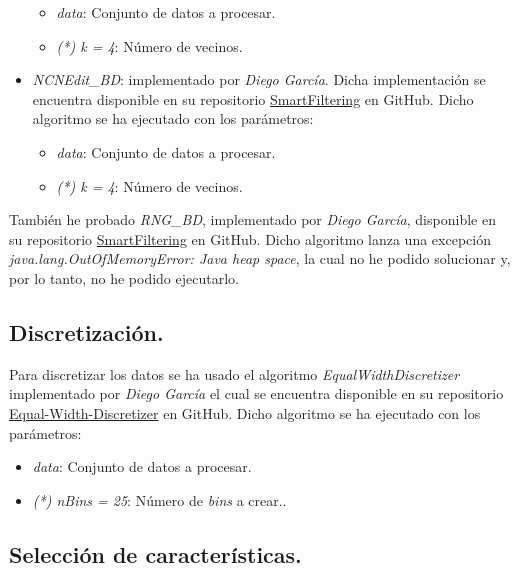 \documentclass[11pt]{article}
\begin{document}
\begin{itemize}
	\begin{itemize}
		\item \textit{data}: Conjunto de datos a procesar.
		\item \textit{(*) k = 4}: Número de vecinos.
	\end{itemize}
	
	\item \textit{NCNEdit\_BD}: implementado por \textit{Diego García}. Dicha implementación se encuentra disponible en su repositorio \href{https://github.com/djgarcia/SmartFiltering}{SmartFiltering} en GitHub. Dicho algoritmo se ha ejecutado con los parámetros:
	
	\begin{itemize}
		\item \textit{data}: Conjunto de datos a procesar.
		\item \textit{(*) k = 4}: Número de vecinos.
	\end{itemize}
	
\end{itemize}

También he probado \textit{RNG\_BD}, implementado por \textit{Diego García}, disponible en su repositorio \href{https://github.com/djgarcia/SmartFiltering}{SmartFiltering} en GitHub. Dicho algoritmo lanza una excepción \textit{ java.lang.OutOfMemoryError: Java heap space}, la cual no he podido solucionar y, por lo tanto, no he podido ejecutarlo.

\subsection{Discretización.}

Para discretizar los datos se ha usado el algoritmo \textit{EqualWidthDiscretizer} implementado por \textit{Diego García} el cual se encuentra disponible en su repositorio \href{https://github.com/djgarcia/Equal-Width-Discretizer}{Equal-Width-Discretizer} en GitHub. Dicho algoritmo se ha ejecutado con los parámetros:

\begin{itemize}
	\item \textit{data}: Conjunto de datos a procesar.
	\item \textit{(*) nBins = 25}: Número de \textit{bins} a crear..
\end{itemize}

\subsection{Selección de características.}
\end{document}
